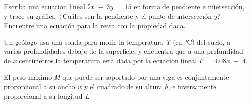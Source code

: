 \documentclass{exam}[letterpaper,10pt]
\begin{document}
\begin{multicols}{2}
\begin{questions}
    \question \textnormal{Escriba una ecuaci\'on lineal \(2x\;-\;3y\,=\,15\) en forma de pendiente e intersecci\'on, y trace su gr\'afica. ¿Cu\'ales son la pendiente y el punto de intersecci\'on \(y\)?}
    \question \textnormal{Encuentre una ecuaci\'on para la recta con la propiedad dada.}
    \question \textnormal{Un ge\'ologo usa una sonda para medir la temperatura \emph{T} (en °C) del suelo, a varias profundidades debajo de la superficie, y encuentra que a una profundidad de \(x\) cent\'imetros la temperatura est\'a dada por la ecuaci\'on lineal \(T\,=\,0.08x\;-\;4\).}
    \question \textnormal{El peso m\'aximo \emph{M} que puede ser soportado por una viga es conjuntamente proporcional a su ancho \emph{w} y el cuadrado de su altura \emph{h}, e inversamente proporcional a su longitud \emph{L}.}
    \begin{parts}

\end{parts}
\end{questions}
\end{multicols}
\end{document}
